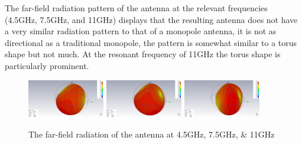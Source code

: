 \documentclass[colorlinks,11pt,a4paper,normalphoto,withhyper,ragged2e]{altareport}
\begin{document}
\newpage

The far-field radiation pattern of the antenna at the relevant frequencies (4.5GHz, 7.5GHz, and 11GHz) displays that the resulting antenna does not have a very similar radiation pattern to that of a monopole antenna, it is not as directional as a traditional monopole, the pattern is somewhat similar to a torus shape but not much. At the resonant frequency of 11GHz the torus shape is particularly prominent.
\linebreak

\begin{figure}[ht!]
\centering

		\includegraphics[width=0.3\textwidth]{Images/far-field-4.5GHz.png}
    	\hfill
		\includegraphics[width=0.3\textwidth]{Images/far-field-7.5GHz.png}
		\hfill
		\includegraphics[width=0.3\textwidth]{Images/far-field-11GHz.png}
	\caption{The far-field radiation of the antenna at 4.5GHz, 7.5GHz, \& 11GHz}\label{fig:far-field}
\end{figure}


\newpage
{}  %


\end{document}
